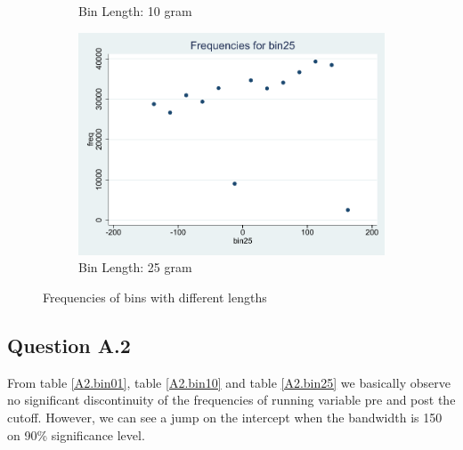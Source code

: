 \documentclass[a4paper,11pt]{article}
\begin{document}
\begin{figure}[h]
\begin{subfigure}{.33\textwidth}
  \caption{Bin Length: 10 gram}
  \label{fig:sub2}
\end{subfigure}
\begin{subfigure}{.33\textwidth}
  \centering
  \includegraphics[width=1\linewidth]{graph_bin25.pdf}
  \caption{Bin Length: 25 gram}
  \label{fig:sub3}
\end{subfigure}
\caption{Frequencies of bins with different lengths}
\label{fig:A1}
\end{figure}

\subsection*{Question A.2}

From table \ref{A2.bin01}, table \ref{A2.bin10}
and table \ref{A2.bin25} we basically observe no significant discontinuity of the frequencies of running variable pre and post the cutoff. However, we can see a jump on the intercept when the bandwidth is 150 on 90\% significance level.
\end{document}
